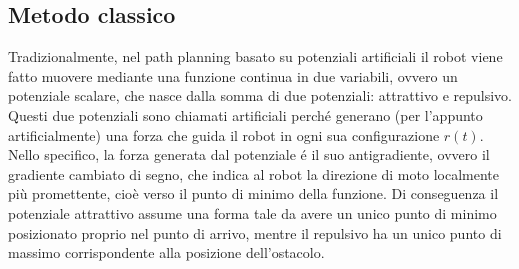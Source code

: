 \documentclass[14pt,twoside,a4paper]{extarticle}
\begin{document}
\subsection{Metodo classico}
Tradizionalmente, nel path planning basato su potenziali artificiali il robot viene fatto muovere mediante una funzione continua in due variabili, ovvero un potenziale scalare, che nasce dalla somma di due potenziali: attrattivo e repulsivo. Questi due potenziali sono chiamati artificiali perché generano (per l'appunto artificialmente) una forza che guida il robot in ogni sua configurazione \( r(t)\). Nello specifico, la forza generata dal potenziale é il suo antigradiente, ovvero il gradiente cambiato di segno, che indica al robot la direzione di moto localmente più promettente\cite{oriolo}, cioè verso il punto di minimo della funzione. Di conseguenza il potenziale attrattivo assume una forma tale da avere un unico punto di minimo posizionato proprio nel punto di arrivo, mentre il repulsivo ha un unico punto di massimo corrispondente alla posizione dell'ostacolo. 
\end{document}
